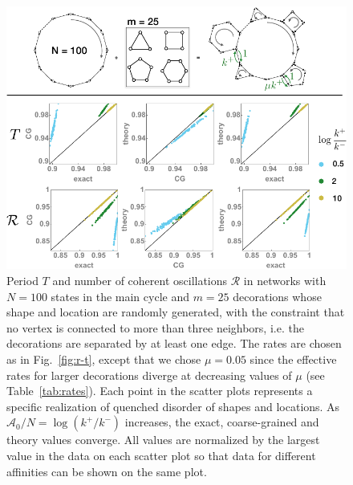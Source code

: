 \documentclass[amsmath, preprintnumbers, 10pt, twocolumn, pre, bibliograpy]{revtex4-1}
\newcommand{\aff}{\mathcal A}
\newcommand{\R}{\mathcal R}
\begin{document}
\begin{figure}
\centering
\includegraphics[width=\linewidth]{fig-4}
 \caption{Period $T$ and number of coherent oscillations $\R$ in networks with $N = 100$ states in the main cycle and $m = 25$ decorations whose shape and location are randomly generated, with the constraint that no vertex is connected to more than three neighbors, i.e. the decorations are separated by at least one edge. The rates are chosen as in Fig.~\ref{fig:r-t}, except that we chose $\mu = 0.05$ since the effective rates for larger decorations diverge at decreasing values of $\mu$ (see Table~\ref{tab:rates}).  Each point in the scatter plots represents a specific realization of quenched disorder of shapes and locations. As $\aff_0/N = \log(k^+/k^-)$ increases, the exact, coarse-grained and theory values converge. All values are normalized by the largest value in the data on each scatter plot so that data for different affinities can be shown on the same plot.}
\label{fig:r-t-random}
\end{figure}
\end{document}
